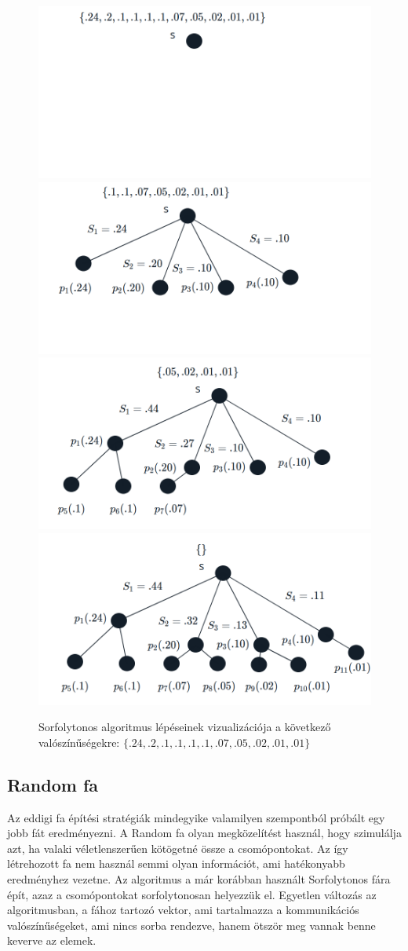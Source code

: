 \documentclass[12pt]{report}
\begin{document}
\begin{figure}[H]
	\begin{center}
		\includegraphics[width=0.49\linewidth]{pictures/bfs1.png}
		\includegraphics[width=0.49\linewidth]{pictures/bfs2.png}
		\includegraphics[width=0.49\linewidth]{pictures/bfs3.png}
		\includegraphics[width=0.49\linewidth]{pictures/bfs4.png}
		\caption{Sorfolytonos algoritmus lépéseinek vizualizációja a következő valószínűségekre: 
			\( \{.24, .2, .1, .1, .1, .1, .07, .05, .02, .01, .01\}\)}
		\label{bfs-algorithm}
	\end{center}
\end{figure}



\subsection{Random fa}

Az eddigi fa építési stratégiák mindegyike valamilyen szempontból próbált egy jobb fát eredményezni.
A Random fa olyan megközelítést használ, hogy szimulálja azt, ha valaki véletlenszerűen kötögetné össze a csomópontokat.
Az így létrehozott fa nem használ semmi olyan információt, ami hatékonyabb eredményhez vezetne.
Az algoritmus a már korábban használt Sorfolytonos fára épít, azaz a csomópontokat sorfolytonosan helyezzük el.
Egyetlen változás az algoritmusban, a fához tartozó vektor, ami tartalmazza a kommunikációs valószínűségeket, ami nincs sorba rendezve, hanem ötször meg vannak benne keverve az elemek. 
\end{document}
